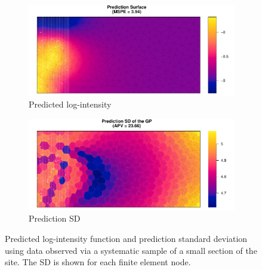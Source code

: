\documentclass[review]{elsarticle}
\begin{document}
\begin{figure}

\begin{subfigure}{5in}
\includegraphics[width=5in]{../graphics/lambda-BadXsect-LGCP000004.pdf}
\caption{Predicted log-intensity}
\label{lambdabad}
\end{subfigure}

\begin{subfigure}{5in}
\includegraphics[width=5in]{../graphics/lambdaSD-BadXsect-LGCP000004.pdf}
\caption{Prediction SD}
\label{sdbad}
\end{subfigure}

\caption{Predicted log-intensity function and prediction standard deviation
using data observed via a systematic sample of a small section of the site. The
SD is shown for each finite element node.}
\label{badxsect}
\end{figure}
\end{document}
